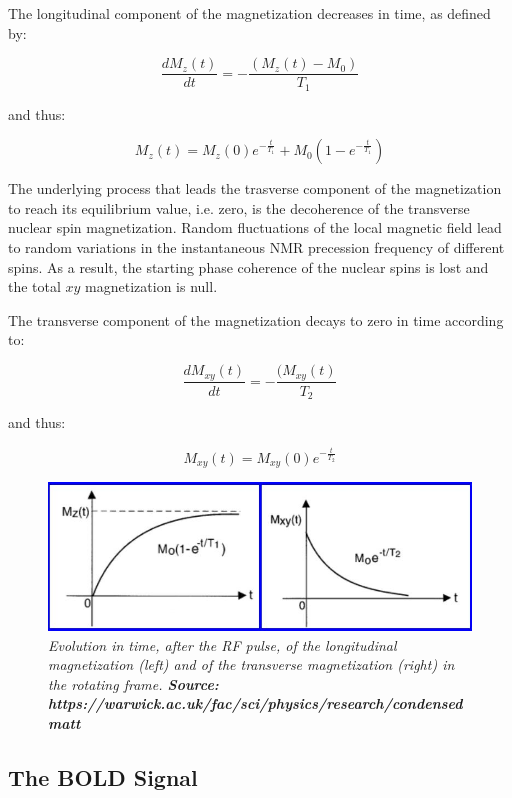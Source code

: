 \documentclass[12pt,openright,twoside,a4paper]{book}
\begin{document}
The longitudinal component of the magnetization decreases in time, as defined by:

\begin{equation}
\frac{dM_z(t)}{dt}=-\frac{(M_z(t)-M_0)}{T_1}
\end{equation}

and thus:

\begin{equation}
M_z(t)=M_z(0)e^{-\frac{t}{T_1}}+ M_0(1-e^{-\frac{t}{T_1}})
\end{equation}

The underlying process that leads the trasverse component of the magnetization to reach its equilibrium value, i.e. zero, is the decoherence of the transverse nuclear spin magnetization. 
Random  fluctuations of the local magnetic  field lead to random variations in the instantaneous NMR precession frequency of different spins. 
As a result, the starting phase coherence of the nuclear spins is lost and the total $xy$ magnetization is null. 

The transverse component of the magnetization decays to zero in time according to:

\begin{equation}
\frac{dM_{xy}(t)}{dt}=-\frac{(M_{xy}(t)}{T_2}
\end{equation}

and thus:

\begin{equation}
M_{xy}(t)=M_{xy}(0)e^{-\frac{t}{T_2}}
\end{equation}

\begin{figure}[!h]
\centering
\includegraphics[scale=0.5]{relaxation}
\caption{\textit{ Evolution in time, after the RF pulse, of the longitudinal magnetization (left) and of the transverse magnetization (right) in the rotating frame. \textbf{Source: https://warwick.ac.uk/fac/sci/physics/research/condensedmatt}}}
\label{relaxation}
\end{figure}

\subsection{The BOLD Signal}
\end{document}
